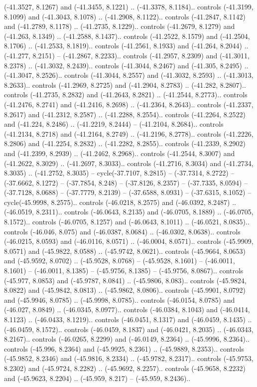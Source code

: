 \begin{scope}[shift={(2.5552, 9.9912)}]
\begin{scope}[shift={(48.1654, -14.8546)}]
(-41.3527, 8.1267) and (-41.3455, 8.1221) .. (-41.3378, 8.1184).. controls (-41.3199, 8.1099) and (-41.3043, 8.1078) .. (-41.2908, 8.1122).. controls (-41.2847, 8.1142) and (-41.2789, 8.1178) .. (-41.2735, 8.1229).. controls (-41.2679, 8.1279) and (-41.263, 8.1349) .. (-41.2588, 8.1437).. controls (-41.2522, 8.1579) and (-41.2504, 8.1706) .. (-41.2533, 8.1819).. controls (-41.2561, 8.1933) and (-41.264, 8.2044) .. (-41.277, 8.2151) -- (-41.2867, 8.2233).. controls (-41.2957, 8.2309) and (-41.3011, 8.2378) .. (-41.3032, 8.2439).. controls (-41.3044, 8.2467) and (-41.305, 8.2495) .. (-41.3047, 8.2526).. controls (-41.3044, 8.2557) and (-41.3032, 8.2593) .. (-41.3013, 8.2633).. controls (-41.2969, 8.2725) and (-41.2904, 8.2783) .. (-41.282, 8.2807).. controls (-41.2735, 8.2832) and (-41.2643, 8.2821) .. (-41.2544, 8.2773).. controls (-41.2476, 8.2741) and (-41.2416, 8.2698) .. (-41.2364, 8.2643).. controls (-41.2337, 8.2617) and (-41.2312, 8.2587) .. (-41.2288, 8.2554).. controls (-41.2264, 8.2522) and (-41.224, 8.2486) .. (-41.2219, 8.2444) -- (-41.2104, 8.2684).. controls (-41.2134, 8.2718) and (-41.2164, 8.2749) .. (-41.2196, 8.2778).. controls (-41.2226, 8.2806) and (-41.2254, 8.2832) .. (-41.2282, 8.2855).. controls (-41.2339, 8.2902) and (-41.2399, 8.2939) .. (-41.2462, 8.2968).. controls (-41.2544, 8.3007) and (-41.2622, 8.3029) .. (-41.2697, 8.3033).. controls (-41.2716, 8.3034) and (-41.2734, 8.3035) .. (-41.2752, 8.3035) -- cycle(-37.7107, 8.2815) -- (-37.7314, 8.2722) -- (-37.6662, 8.1272) -- (-37.7854, 8.248) -- (-37.8126, 8.2357) -- (-37.7335, 8.0594) -- (-37.7128, 8.0688) -- (-37.7779, 8.2139) -- (-37.6588, 8.0931) -- (-37.6315, 8.1052) -- cycle(-45.9998, 8.2575).. controls (-46.0218, 8.2575) and (-46.0392, 8.2487) .. (-46.0519, 8.2311).. controls (-46.0643, 8.2135) and (-46.0705, 8.1889) .. (-46.0705, 8.1572).. controls (-46.0705, 8.1257) and (-46.0643, 8.1011) .. (-46.0521, 8.0835).. controls (-46.046, 8.075) and (-46.0387, 8.0684) .. (-46.0302, 8.0638).. controls (-46.0215, 8.0593) and (-46.0116, 8.0571) .. (-46.0004, 8.0571).. controls (-45.9909, 8.0571) and (-45.9822, 8.0588) .. (-45.9742, 8.0621).. controls (-45.9664, 8.0653) and (-45.9592, 8.0702) .. (-45.9528, 8.0768) -- (-45.9528, 8.1601) -- (-46.0011, 8.1601) -- (-46.0011, 8.1385) -- (-45.9756, 8.1385) -- (-45.9756, 8.0867).. controls (-45.977, 8.0853) and (-45.9787, 8.0841) .. (-45.9806, 8.083).. controls (-45.9824, 8.0822) and (-45.9842, 8.0813) .. (-45.9862, 8.0806).. controls (-45.9901, 8.0792) and (-45.9946, 8.0785) .. (-45.9998, 8.0785).. controls (-46.0154, 8.0785) and (-46.027, 8.0849) .. (-46.0345, 8.0977).. controls (-46.0384, 8.1043) and (-46.0414, 8.1123) .. (-46.0433, 8.1219).. controls (-46.0451, 8.1317) and (-46.0459, 8.1435) .. (-46.0459, 8.1572).. controls (-46.0459, 8.1837) and (-46.0421, 8.2035) .. (-46.0343, 8.2167).. controls (-46.0265, 8.2299) and (-46.0149, 8.2364) .. (-45.9996, 8.2364).. controls (-45.996, 8.2364) and (-45.9925, 8.2361) .. (-45.9889, 8.2353).. controls (-45.9852, 8.2346) and (-45.9816, 8.2334) .. (-45.9782, 8.2317).. controls (-45.9753, 8.2302) and (-45.9724, 8.2282) .. (-45.9692, 8.2257).. controls (-45.9658, 8.2232) and (-45.9623, 8.2204) .. (-45.959, 8.217) -- (-45.959, 8.2436).. 
\end{scope}
\end{scope}
